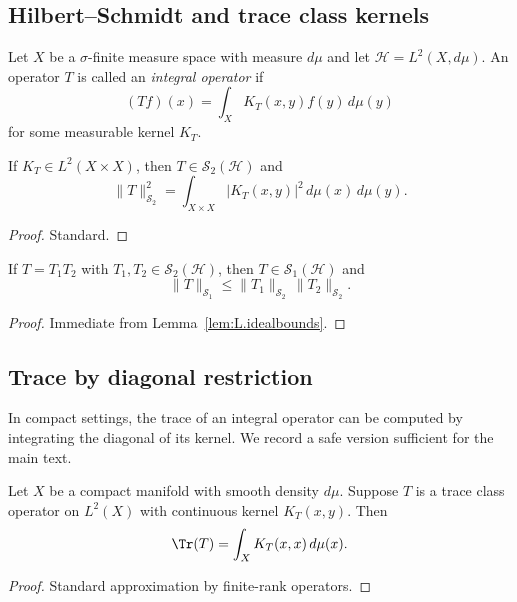 \subsection{Hilbert--Schmidt and trace class kernels}
\label{subsec:L.hs.trace}

Let $X$ be a $\sigma$-finite measure space with measure $d\mu$ and let $\mathcal{H}=L^2(X,d\mu)$.
An operator $T$ is called an \emph{integral operator} if
\[
(Tf)(x)=\int_X K_T(x,y)f(y)\,d\mu(y)
\]
for some measurable kernel $K_T$.

\begin{lemma}
\label{lem:L.hs.criterion}
If $K_T\in L^2(X\times X)$, then $T\in \mathcal{S}_2(\mathcal{H})$ and
\[
\|T\|_{\mathcal{S}_2}^2 = \int_{X\times X} |K_T(x,y)|^2\,d\mu(x)\,d\mu(y).
\]
\end{lemma}

\begin{proof}
Standard.
\end{proof}

\begin{lemma}
\label{lem:L.trace.factor}
If $T=T_1T_2$ with $T_1,T_2\in\mathcal{S}_2(\mathcal{H})$, then $T\in\mathcal{S}_1(\mathcal{H})$ and
\[
\|T\|_{\mathcal{S}_1}\le \|T_1\|_{\mathcal{S}_2}\,\|T_2\|_{\mathcal{S}_2}.
\]
\end{lemma}

\begin{proof}
Immediate from Lemma~\ref{lem:L.idealbounds}.
\end{proof}

\subsection{Trace by diagonal restriction}
\label{subsec:L.diagonal}

In compact settings, the trace of an integral operator can be computed by integrating the diagonal of its kernel.
We record a safe version sufficient for the main text.

\begin{proposition}
\label{prop:L.diagonal.trace}
Let $X$ be a compact manifold with smooth density $d\mu$.
Suppose $T$ is a trace class operator on $L^2(X)$ with continuous kernel $K_T(x,y)$.
Then
\[
\Tr(T)=\int_X K_T(x,x)\,d\mu(x).
\]
\end{proposition}

\begin{proof}
Standard approximation by finite-rank operators.
\end{proof}

